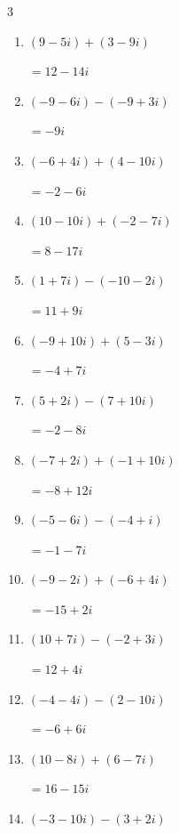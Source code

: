 \begin{multicols}{3}
\begin{enumerate}
  \item $\displaystyle (9-5i) + (3-9i)$

        $\displaystyle =12-14i$

  \item $\displaystyle (-9-6i) - (-9+3i)$

        $\displaystyle =-9i$

  \item $\displaystyle (-6+4i) + (4-10i)$

        $\displaystyle =-2-6i$

  \item $\displaystyle (10-10i) + (-2-7i)$

        $\displaystyle =8-17i$

  \item $\displaystyle (1+7i) - (-10-2i)$

        $\displaystyle =11+9i$

  \item $\displaystyle (-9+10i) + (5-3i)$

        $\displaystyle =-4+7i$

  \item $\displaystyle (5+2i) - (7+10i)$

        $\displaystyle =-2-8i$

\columnbreak %

  \item $\displaystyle (-7+2i) + (-1+10i)$

        $\displaystyle =-8+12i$

  \item $\displaystyle (-5-6i) - (-4+i)$

        $\displaystyle =-1-7i$

  \item $\displaystyle (-9-2i) + (-6+4i)$

        $\displaystyle =-15+2i$

  \item $\displaystyle (10+7i) - (-2+3i)$

        $\displaystyle =12+4i$

  \item $\displaystyle (-4-4i) - (2-10i)$

        $\displaystyle =-6+6i$

  \item $\displaystyle (10-8i) + (6-7i)$

        $\displaystyle =16-15i$

  \item $\displaystyle (-3-10i) - (3+2i)$


\end{enumerate}
\end{multicols}
